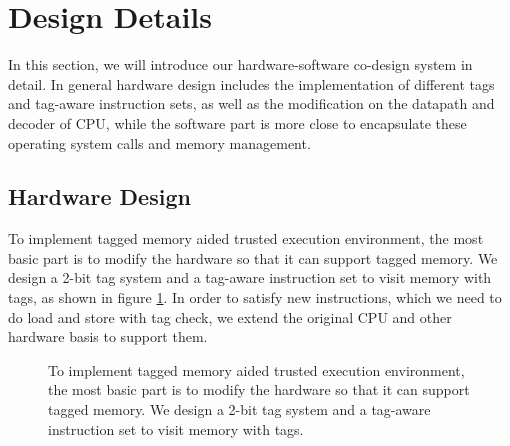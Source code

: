 \documentclass[conference]{IEEEtran}
\begin{document}

\section{Design Details}
In this section, we will introduce our hardware-software co-design system in detail. In general hardware design includes the implementation of different tags and tag-aware instruction sets, as well as the modification on the datapath and decoder of CPU, while the software part is more close to encapsulate these operating system calls and memory management. 

\subsection{Hardware Design}
To implement tagged memory aided trusted execution environment, the most basic part is to modify the hardware so that it can support tagged memory. We design a 2-bit tag system and a tag-aware instruction set to visit memory with tags, as shown in figure \ref{fig:memory}. In order to satisfy new instructions, which we need to do load and store with tag check, we extend the original CPU and other hardware basis to support them. 

\begin{figure}
	\caption{To implement tagged memory aided trusted execution environment, the most basic part is to modify the hardware so that it can support tagged memory. We design a 2-bit tag system and a tag-aware instruction set to visit memory with tags.}
	\label{fig:memory}
\end{figure}
\end{document}
